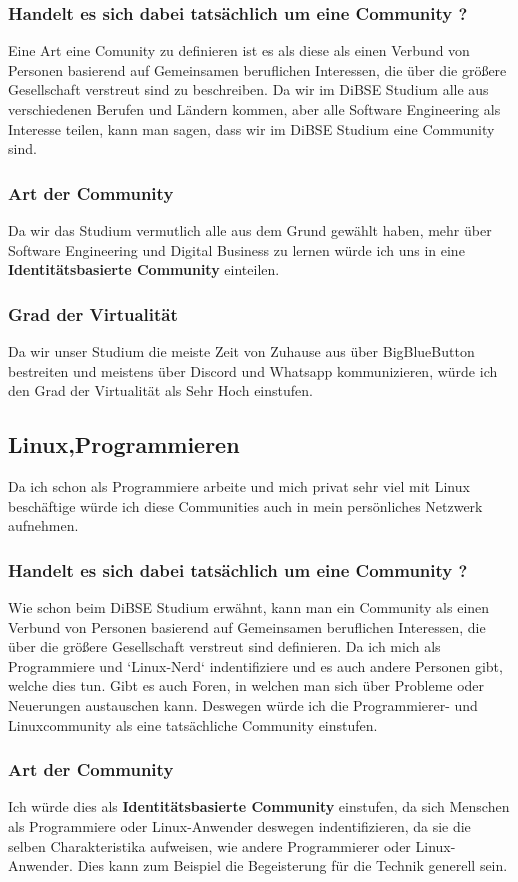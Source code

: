 \documentclass[12pt]{article}
\begin{document}
\subsubsection{Handelt es sich dabei tatsächlich um eine Community ?}
Eine Art eine Comunity zu definieren ist es als diese als einen Verbund von Personen basierend auf Gemeinsamen beruflichen Interessen, die über die größere Gesellschaft verstreut sind zu beschreiben. Da wir im DiBSE Studium alle aus verschiedenen Berufen und Ländern kommen, aber alle Software Engineering als Interesse teilen, kann man sagen, dass wir im DiBSE Studium eine Community sind.
\subsubsection{Art der Community}
Da wir das Studium vermutlich alle aus dem Grund gewählt haben, mehr über Software Engineering und Digital Business zu lernen würde ich uns in eine \textbf{Identitätsbasierte Community} einteilen.
\subsubsection{Grad der Virtualität}
Da wir unser Studium die meiste Zeit von Zuhause aus über BigBlueButton bestreiten und meistens über Discord und Whatsapp kommunizieren, würde ich den Grad der Virtualität als Sehr Hoch einstufen.
\subsection{Linux,Programmieren}
Da ich schon als Programmiere arbeite und mich privat sehr viel mit Linux beschäftige würde ich diese Communities auch in mein persönliches Netzwerk aufnehmen.
\subsubsection{Handelt es sich dabei tatsächlich um eine Community ?}
Wie schon beim DiBSE Studium erwähnt, kann man ein Community als einen Verbund von Personen basierend auf Gemeinsamen beruflichen Interessen, die über die größere Gesellschaft verstreut sind definieren. Da ich mich als Programmiere und `Linux-Nerd` indentifiziere und es auch andere Personen gibt, welche dies tun. Gibt es auch Foren, in welchen man sich über Probleme oder Neuerungen austauschen kann. Deswegen würde ich die Programmierer- und Linuxcommunity als eine tatsächliche Community einstufen.
\subsubsection{Art der Community}
Ich würde dies als \textbf{Identitätsbasierte Community} einstufen, da sich Menschen als Programmiere oder Linux-Anwender deswegen indentifizieren, da sie die selben Charakteristika aufweisen, wie andere Programmierer oder Linux-Anwender. Dies kann zum Beispiel die Begeisterung für die Technik generell sein.
\end{document}
